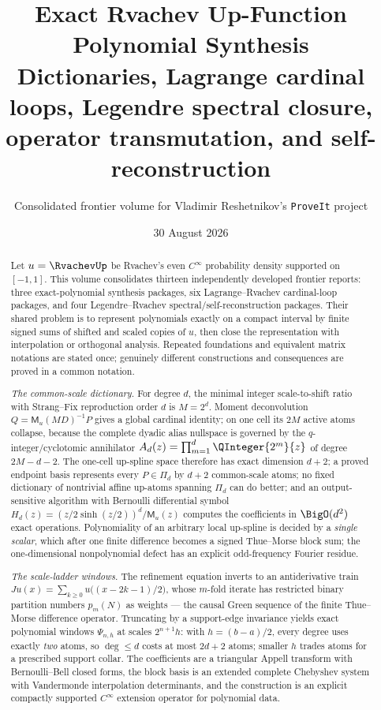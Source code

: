 \documentclass[11pt,oneside]{article}
\title{\bfseries Exact Rvachev Up-Function Polynomial Synthesis\\[0.4em]
\large Dictionaries, Lagrange cardinal loops, Legendre spectral closure,\\
operator transmutation, and self-reconstruction}
\author{Consolidated frontier volume for Vladimir Reshetnikov's \texttt{ProveIt} project}
\date{30 August 2026}
\numberwithin{equation}{section}
\theoremstyle{definition}
\theoremstyle{remark}
\newcommand{\MM}{\mathsf M}
\newcommand{\PiD}{\Pi_d}
\begin{document}
\maketitle

\begin{abstract}
\noindent
Let $u=\RvachevUp$ be Rvachev's even $C^\infty$ probability density supported
on $[-1,1]$.  This volume consolidates thirteen independently developed
frontier reports: three exact-polynomial synthesis packages, six
Lagrange--Rvachev cardinal-loop packages, and four Legendre--Rvachev
spectral/self-reconstruction packages.  Their shared problem is to represent
polynomials exactly on a compact interval by finite signed sums of shifted and
scaled copies of $u$, then close the representation with interpolation or
orthogonal analysis.  Repeated foundations and equivalent matrix notations
are stated once; genuinely different constructions and consequences are
proved in a common notation.

\emph{The common-scale dictionary.}  For degree $d$, the minimal
integer scale-to-shift ratio with Strang--Fix reproduction order $d$
is $M=2^{d}$.  Moment deconvolution
$Q=\MM_u(MD)^{-1}P$ gives a global cardinal identity; on one cell its
$2M$ active atoms collapse, because the complete dyadic alias
nullspace is governed by the $q$-integer/cyclotomic annihilator
$A_d(z)=\prod_{m=1}^{d}\QInteger{2^{m}}{z}$ of degree $2M-d-2$.  The one-cell
up-spline space therefore has exact dimension $d+2$; a proved endpoint
basis represents every $P\in\PiD$ by $d+2$ common-scale atoms; no
fixed dictionary of nontrivial affine up-atoms spanning $\PiD$ can do
better; and an output-sensitive algorithm with Bernoulli differential
symbol $H_d(z)=(z/2\sinh(z/2))^{d}/\MM_u(z)$ computes the coefficients
in $\BigO(d^{2})$ exact operations.  Polynomiality of an arbitrary
local up-spline is decided by a \emph{single scalar}, which after one
finite difference becomes a signed Thue--Morse block sum; the
one-dimensional nonpolynomial defect has an explicit odd-frequency
Fourier residue.

\emph{The scale-ladder windows.}  The refinement equation inverts to
an antiderivative train
$Ju(x)=\sum_{k\ge0}u\bigl((x-2k-1)/2\bigr)$, whose $m$-fold iterate
has restricted binary partition numbers $p_m(N)$ as weights --- the
causal Green sequence of the finite Thue--Morse difference operator.
Truncating by a support-edge invariance yields exact polynomial
windows $\Psi_{n,h}$ at scales $2^{n+1}h$: with $h=(b-a)/2$, every
degree uses exactly \emph{two} atoms, so $\deg\le d$ costs at most
$2d+2$ atoms; smaller $h$ trades atoms for a prescribed support
collar.  The coefficients are a triangular Appell transform with
Bernoulli--Bell closed forms, the block basis is an extended complete
Chebyshev system with Vandermonde interpolation determinants, and the
construction is an explicit compactly supported $C^\infty$ extension
operator for polynomial data.


\end{abstract}
\end{document}
